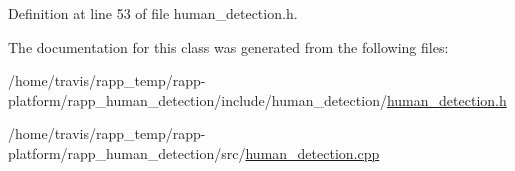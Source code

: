 Definition at line 53 of file human\-\_\-detection.\-h.



The documentation for this class was generated from the following files\-:\begin{DoxyCompactItemize}
\item 
/home/travis/rapp\-\_\-temp/rapp-\/platform/rapp\-\_\-human\-\_\-detection/include/human\-\_\-detection/\hyperlink{human__detection_8h}{human\-\_\-detection.\-h}\item 
/home/travis/rapp\-\_\-temp/rapp-\/platform/rapp\-\_\-human\-\_\-detection/src/\hyperlink{human__detection_8cpp}{human\-\_\-detection.\-cpp}\end{DoxyCompactItemize}
